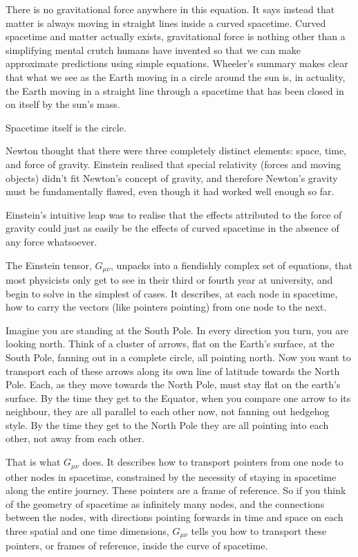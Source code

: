 There is no gravitational force anywhere in this equation. It says instead that matter is always moving in straight lines inside a curved spacetime. Curved spacetime and matter actually exists, gravitational force is nothing other than a simplifying mental crutch humans have invented so that we can make approximate predictions using simple equations. Wheeler's summary makes clear that what we see as the Earth moving in a circle around the sun is, in actuality, the Earth moving in a straight line through a spacetime that has been closed in on itself by the sun’s mass.


Spacetime itself is the circle.


Newton thought that there were three completely distinct elements: space, time, and force of gravity. Einstein realised that special relativity (forces and moving objects) didn’t fit Newton's concept of gravity, and therefore Newton’s gravity must be fundamentally flawed, even though it had worked well enough so far. 


Einstein's intuitive leap was to realise that the effects attributed to the force of gravity could just as easily be the effects of curved spacetime in the absence of any force whatsoever. 


The Einstein tensor, $G_{\mu\nu}$, unpacks into a fiendishly complex set of equations, that most physicists only get to see in their third or fourth year at university, and begin to solve in the simplest of cases. It describes, at each node in spacetime, how to carry the vectors (like pointers pointing) from one node to the next.


Imagine you are standing at the South Pole. In every direction you turn, you are looking north. Think of a cluster of arrows, flat on the Earth's surface, at the South Pole, fanning out in a complete circle, all pointing north. Now you want to transport each of these arrows along its own line of latitude towards the North Pole. Each, as they move towards the North Pole, must stay flat on the earth's surface. By the time they get to the Equator, when you compare one arrow to its neighbour, they are all parallel to each other now, not fanning out hedgehog style. By the time they get to the North Pole they are all pointing into each other, not away from each other.


That is what $G_{\mu\nu}$ does. It describes how to transport pointers from one node to other nodes in spacetime, constrained by the necessity of staying in spacetime along the entire journey. These pointers are a frame of reference. So if you think of the geometry of spacetime as infinitely many nodes, and the connections between the nodes, with directions pointing forwards in time and space on each three spatial and one time dimensions, $G_{\mu\nu}$ tells you how to transport these pointers, or frames of reference, inside the curve of spacetime. 


